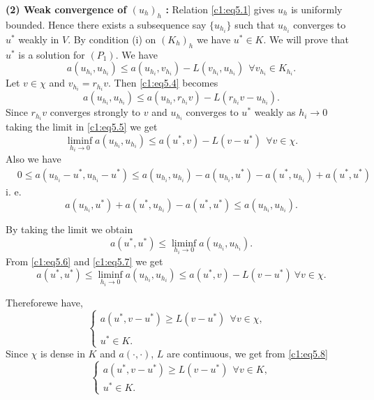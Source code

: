 \medskip
\noindent
\textbf{(2) Weak convergence of $(u_h)_h$ :} Relation \eqref{c1:eq5.1} gives
$u_h$ is uniformly bounded. Hence there exists a subsequence say
$\{u_{h_{i}}\}$ such that $u_{h_{i}}$ converges to $u^*$ weakly in
$V$. By condition (i) on $(K_h)_h$ we have $u^* \in K$. We will
prove that $u^*$ is a solution for $(P_1)$. We have  
\begin{equation}
a(u_{h_{i}}, u_{h_{i}}) \leq a(u_{h_{i}}, v_{h_{i}})-L(v_{h_{i}},
u_{h_{i}}) ~~\forall v_{h_{i}} \in K_{h_{i}}. \tag{5.4}\label{c1:eq5.4} 
\end{equation}
Let $v \in \chi$ and $v_{h_{i}} = r_{h_{i}} v$. Then \eqref{c1:eq5.4} becomes 
\begin{equation}
a(u_{h_{i}}, u_{h_{i}}) \leq a(u_{h_{i}}, r_{h_{i}} v)-L(r_{h_{i}}
v-u_{h_{i}}). \tag{5.5}\label{c1:eq5.5} 
\end{equation}
Since $r_{h_{i}} v$ converges strongly to $v$ and $u_{h_{i}}$
converges to $u^*$ weakly as $h_i \to 0$ taking the limit in
\eqref{c1:eq5.5} we get  
\begin{equation}
\mathop{\lim\inf}_{h_{i} \to 0} a(u_{h_{i}}, u_{h_{i}} )
\leq a(u^*, v) -L(v-u^* ) ~~\forall v \in \chi.\tag{5.6}\label{c1:eq5.6} 
\end{equation}
Also we have 
\begin{align*}
 & 0 \leq a(u_{h_{i}}-u^*, u_{h_{i}} -u^*)  \leq a(u_{h_{i}},
  u_{h_{i}} )-a(u_{h_{i}},u^*)-a (u^*,u_{h_{i}}) +a(u^*,u^*)
\end{align*}
i. e.
\begin{equation*}
 a(u_{h_{i}},u^*) +a(u^*,u_{h_{i}} )-a(u^*,u^* )
\leq a(u_{h_{i}},u_{h_{i}}). 
\end{equation*}

By taking the limit we obtain
\begin{equation}
a(u^*, u^*) \leq \mathop{\lim\inf}_{h_i \to 0} a(u_{h_{i}},
u_{h_{i}}). \tag{5.7}\label{c1:eq5.7} 
\end{equation}
From \eqref{c1:eq5.6} and \eqref{c1:eq5.7} we get
$$
a(u^*, u^*) \leq \mathop{\lim\inf}_{h_i \to 0} a(u_{h_{i}},
u_{h_{i}}) \leq a(u^*, v)-L(v - u^*) ~\forall v \in \chi. 
$$

Therefore\pageoriginale we have, 
\begin{equation}
\tag{5.8}\label{c1:eq5.8}
\begin{cases}
a(u^*, v-u^*) \geq L(v-u^*) ~~\forall v \in \chi, \\
&\\
u^* \in K.
\end{cases}
\end{equation}
Since $\chi$ is dense in $K$ and $a(\cdot , \cdot)$, $L$ are continuous, we
get from \eqref{c1:eq5.8}
\begin{equation}
\begin{cases}
a(u^*, v-u^*) \geq L(v-u^*) ~~\forall v \in K, \\
u^* \in K.
\end{cases}\tag{5.9}\label{c1:eq5.9}
\end{equation}

